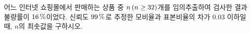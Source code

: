 어느 인터넷 쇼핑몰에서 판매하는 상품 중 $n\mkern3mu (n\ge 32)$개를 임의추출하여 검사한 결과 불량률이 $16\mkern3mu \%$이었다. 신뢰도 $99\mkern3mu \%$로 추정한 모비율과 표본비율의 차가 $0.03$ 이하일 때, $n$의 최솟값을 구하시오. 
